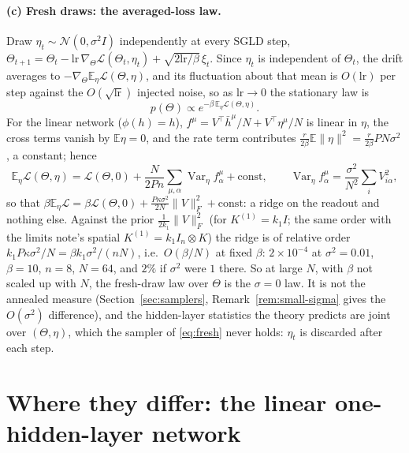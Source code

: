 \documentclass[11pt,a4paper]{article}
\newcommand{\E}{\mathbb E}
\newcommand{\Lc}{\mathcal L}
\newcommand{\Var}{\operatorname{Var}}
\newcommand{\hb}{\bar h}
\newcommand{\lr}{\mathrm{lr}}
\theoremstyle{remark}
\begin{document}
\paragraph{(c) Fresh draws: the averaged-loss law.}
Draw $\eta_t\sim\mathcal N(0,\sigma^2I)$ independently at every SGLD step,
$\Theta_{t+1} = \Theta_t - \lr\,\nabla_\Theta\Lc(\Theta_t,\eta_t) + \sqrt{2\lr/\beta}\,\xi_t$.
Since $\eta_t$ is independent of $\Theta_t$, the drift averages to
$-\nabla_\Theta\E_\eta\Lc(\Theta,\eta)$, and its fluctuation about that mean is
$O(\lr)$ per step against the $O(\sqrt{\lr})$ injected noise, so as $\lr\to0$
the stationary law is
\begin{equation}
  p(\Theta)\propto e^{-\beta\,\E_\eta\Lc(\Theta,\eta)} .
  \label{eq:fresh}
\end{equation}
For the linear network ($\phi(h) = h$), $f^\mu = V^\top\hb^\mu/N + V^\top\eta^\mu/N$
is linear in $\eta$, the cross terms vanish by $\E\eta = 0$, and the rate
term contributes $\frac r{2\beta}\E\|\eta\|^2 = \frac{r}{2\beta}PN\sigma^2$, a
constant; hence
\begin{equation}
  \E_\eta\Lc(\Theta,\eta)
  = \Lc(\Theta,0) + \frac{N}{2Pn}\sum_{\mu,\alpha}\Var_\eta f^\mu_\alpha + \text{const},
  \qquad
  \Var_\eta f^\mu_\alpha = \frac{\sigma^2}{N^2}\sum_i V_{i\alpha}^2 ,
  \label{eq:avg-loss}
\end{equation}
so that $\beta\E_\eta\Lc = \beta\Lc(\Theta,0) + \frac{P\kappa\sigma^2}{2N}\|V\|_F^2 + \text{const}$:
a ridge on the readout and nothing else. Against the prior
$\frac{1}{2k_1}\|V\|_F^2$ (for $K^{(1)} = k_1 I$; the same order with the
limits note's spatial $K^{(1)} = k_1 I_n\otimes K$) the ridge is of relative
order $k_1P\kappa\sigma^2/N = \beta k_1\sigma^2/(nN)$, i.e.\ $O(\beta/N)$ at
fixed $\beta$: $2\times10^{-4}$ at $\sigma^2 = 0.01$, $\beta = 10$, $n = 8$,
$N = 64$, and $2\%$ if $\sigma^2$ were $1$ there. So at large $N$, with
$\beta$ not scaled up with $N$, the fresh-draw law over $\Theta$ is the
$\sigma = 0$ law. It is not the annealed
measure (Section~\ref{sec:samplers}, Remark~\ref{rem:small-sigma} gives the
$O(\sigma^2)$ difference), and the hidden-layer statistics the theory
predicts are joint over $(\Theta,\eta)$, which the sampler of
\eqref{eq:fresh} never holds: $\eta_t$ is discarded after each step.

\section{Where they differ: the linear one-hidden-layer network}
\label{sec:differ}
\end{document}
